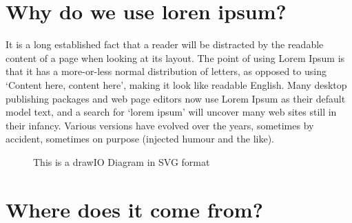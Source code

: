 \nomenclature[g-p]{$\pi$}{ $\simeq 3.14\ldots$}                                             %


\section{Why do we use loren ipsum?} %


It is a long established fact that a reader will be distracted by the readable content of a page when looking at its layout. The point of using Lorem Ipsum is that it has a more-or-less normal distribution of letters, as opposed to using `Content here, content here', making it look like readable English. Many desktop publishing packages and web page editors now use Lorem Ipsum as their default model text, and a search for `lorem ipsum' will uncover many web sites still in their infancy. Various versions have evolved over the years, sometimes by accident, sometimes on purpose (injected humour and the like).
\begin{figure}[htbp!]
  \centering
  
  \caption[Diagram]{This is a drawIO Diagram in SVG format}
  \label{fig:Diagram}
\end{figure}

\section{Where does it come from?}  %
